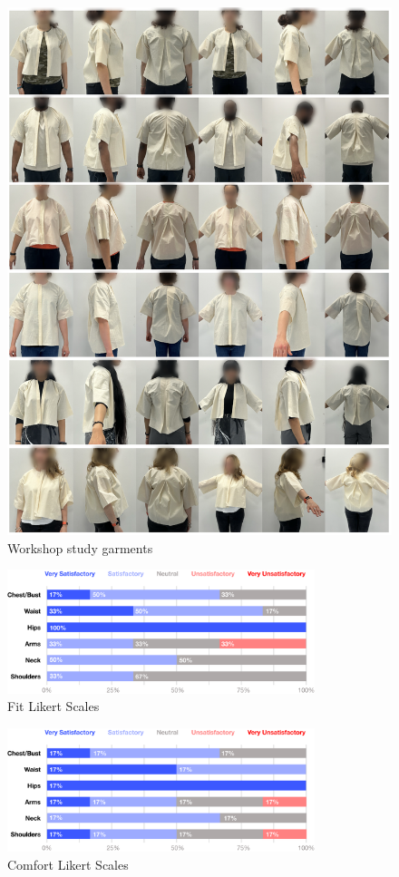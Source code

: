 \newpage
\begin{figure} [H]
    \centering
    \includegraphics[width = \textwidth]{Images/workshop garments.png}
    \caption{Workshop study garments}
    \label{fig:workshop_garments}
\end{figure}

\begin{figure} [H]
    \centering
    \includegraphics[width = 0.8\textwidth]{Images/fit likert stacked bar.png}
    \caption{Fit Likert Scales}
\end{figure}
\begin{figure} [H]
    \centering
    \includegraphics[width = 0.8\textwidth]{Images/comfort likert stacked bar.png}
    \caption{Comfort Likert Scales}
\end{figure}


